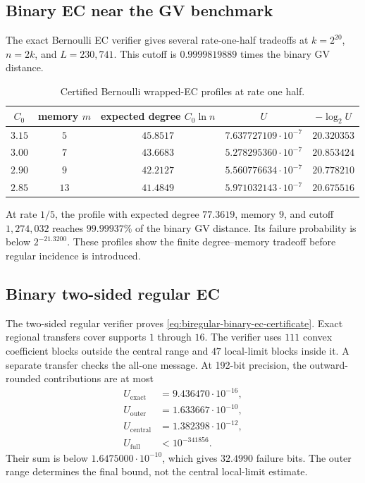 \subsection{Binary EC near the GV benchmark}

The exact Bernoulli EC verifier gives several rate-one-half tradeoffs at
$k=2^{20}$, $n=2k$, and $L=230{,}741$.  This cutoff is
$0.9999819889$ times the binary GV distance.

\begin{table}[t]
\centering
\caption{Certified Bernoulli wrapped-EC profiles at rate one half.}
\label{tab:binary-rate-half-frontier}
\begin{tabular}{@{}ccccc@{}}
\toprule
$C_0$ & memory $m$ & expected degree $C_0\ln n$ & $U$ & $-\log_2U$ \\
\midrule
$3.15$ & $5$  & $45.8517$ & $7.637727109\cdot10^{-7}$ & $20.320353$ \\
$3.00$ & $7$  & $43.6683$ & $5.278295360\cdot10^{-7}$ & $20.853424$ \\
$2.90$ & $9$  & $42.2127$ & $5.560776634\cdot10^{-7}$ & $20.778210$ \\
$2.85$ & $13$ & $41.4849$ & $5.971032143\cdot10^{-7}$ & $20.675516$ \\
\bottomrule
\end{tabular}
\end{table}

At rate $1/5$, the profile with expected degree $77.3619$, memory $9$, and
cutoff $1{,}274{,}032$ reaches $99.99937\%$ of the binary GV distance.  Its
failure probability is below $2^{-21.3200}$.  These profiles show the finite
degree--memory tradeoff before regular incidence is introduced.

\subsection{Binary two-sided regular EC}

The two-sided regular verifier proves
\eqref{eq:biregular-binary-ec-certificate}.  Exact regional transfers cover
supports $1$ through $16$.  The verifier uses $111$ convex coefficient
blocks outside the central range and $47$ local-limit blocks inside it.  A
separate transfer checks the all-one message.  At 192-bit precision, the
outward-rounded contributions are at most
\begin{align*}
 U_{\mathrm{exact}}&=9.436470\cdot10^{-16},\\
 U_{\mathrm{outer}}&=1.633667\cdot10^{-10},\\
 U_{\mathrm{central}}&=1.382398\cdot10^{-12},\\
 U_{\mathrm{full}}&<10^{-341856}.
\end{align*}
Their sum is below $1.6475000\cdot10^{-10}$, which gives $32.4990$ failure
bits.  The outer range determines the final bound, not the central
local-limit estimate.

